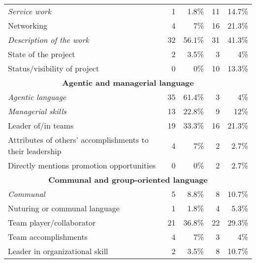 \documentclass[12pt]{caltech_thesis}
\begin{document}
\begin{table}[htbp]
\begin{adjustbox}{max width=\textwidth - 2cm}
\begin{tabular}{|l|r|r|r|r|}
     \hspace{0.5cm} \textit{Service work} & 1     & 1.8\% & 11    & 14.7\% \\
     \hspace{0.5cm} Networking & 4     & 7\% & 16    & 21.3\% \\
     \hspace{0.5cm} \textit{Description of the work} & 32    & 56.1\% & 31    & 41.3\% \\
     \hspace{0.5cm} State of the project & 2     & 3.5\% & 3     & 4\% \\
     \hspace{0.5cm} Status/visibility of project & 0  & 0\% & 10  & 13.3\% \\
     \hline
     \multicolumn{5}{|c|}{\textbf{Agentic and managerial language}} \\
      \hline
     \hspace{0.5cm} \textit{Agentic language} & 35 & 61.4\% & 3 & 4\% \\
     \hspace{0.5cm} \textit{Managerial skills} & 13 & 22.8\% & 9 & 12\% \\
     \hspace{0.5cm} Leader of/in teams & 19 & 33.3\% & 16 & 21.3\% \\
     \hspace{0.5cm} Attributes of others’ accomplishments to their leadership & 4 & 7\% & 2 & 2.7\% \\
     \hspace{0.5cm} Directly mentions promotion opportunities & 0 & 0\% & 2 & 2.7\% \\
     \hline
     \multicolumn{5}{|c|}{\textbf{Communal and group-oriented language}} \\
     \hline
     \hspace{0.5cm} \textit{Communal} & 5 & 8.8\% & 8 & 10.7\% \\
     \hspace{0.5cm} Nuturing or communal language & 1 & 1.8\% & 4 & 5.3\% \\
     \hspace{0.5cm} Team player/collaborator & 21 & 36.8\% & 22 & 29.3\% \\
     \hspace{0.5cm} Team accomplishments & 4 & 7\% & 3 & 4\% \\
     \hspace{0.5cm} Leader in organizational skill & 2 & 3.5\% & 8 & 10.7\% \\

\end{tabular}
\end{adjustbox}
\end{table}
\end{document}
